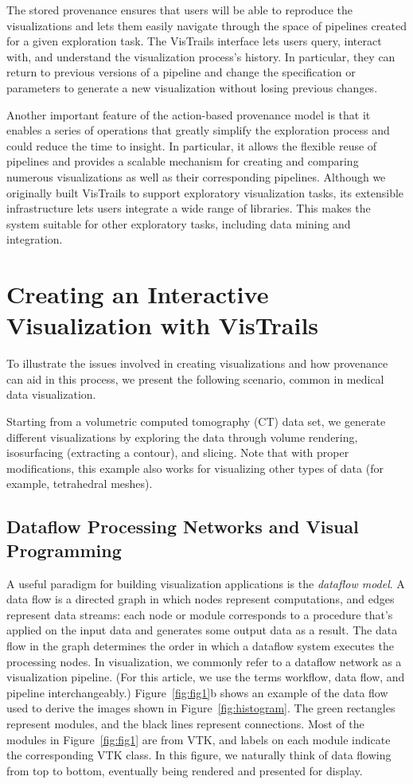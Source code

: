 \documentclass[11pt,twocolumn]{article}
\begin{document}
The stored provenance ensures that users will be able to
reproduce the visualizations and lets them easily navigate through the
space of pipelines created for a given exploration task. The VisTrails
interface lets users query, interact with, and understand the
visualization process’s history. In particular, they can return to
previous versions of a pipeline and change the specification or
parameters to generate a new visualization without losing previous
changes.  

Another important feature of the action-based provenance model is that
it enables a series of operations that greatly simplify the
exploration process and could reduce the time to insight. In
particular, it allows the flexible reuse of pipelines and provides a
scalable mechanism for creating and comparing numerous visualizations
as well as their corresponding pipelines. Although we originally
built VisTrails to support exploratory visualization tasks, its
extensible infrastructure lets users integrate a wide range
of libraries. This makes the system suitable for other exploratory
tasks, including data mining and integration.  

\section{Creating an Interactive Visualization with VisTrails}
To illustrate the issues involved in creating visualizations and how
provenance can aid in this process, we present the following scenario,
common in medical data visualization.

Starting from a volumetric computed tomography (CT) data set, we
generate different visualizations by exploring the data through volume
rendering, isosurfacing (extracting a contour), and slicing. Note that
with proper modifications, this example also works for visualizing
other types of data (for example, tetrahedral meshes). 

\subsection{Dataflow Processing Networks and Visual Programming}
A useful paradigm for building visualization applications is the
\emph{dataflow model}. A data flow is a directed graph in which nodes
represent computations, and edges represent data streams: each node or
module corresponds to a procedure that’s applied on the input data and
generates some output data as a result. The data flow in the graph
determines the order in which a dataflow system executes the
processing nodes. In visualization, we commonly refer to a dataflow
network as a visualization pipeline. (For this article, we use the
terms workflow, data flow, and pipeline interchangeably.)
Figure~\ref{fig:fig1}b shows an example of the data flow used to
derive the images shown in Figure~\ref{fig:histogram}. The green
rectangles represent modules, and the black lines represent
connections. Most of the modules in Figure~\ref{fig:fig1} are from VTK, and
labels on each module indicate the corresponding VTK class. In this
figure, we naturally think of data flowing from top to bottom,
eventually being rendered and presented for display.

 

\end{document}
